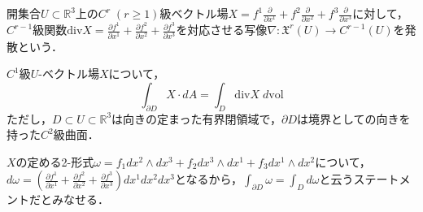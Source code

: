 \documentclass[uplatex, dvipdfmx]{jsreport}
\begin{document}
\begin{definition}[nabla]
    開集合$U\subset\mathbb{R}^3$上の$C^r\;(r\ge 1)$級ベクトル場$X=f^1\frac{\partial}{\partial x^1}+f^2\frac{\partial}{\partial x^2} +f^3\frac{\partial}{\partial x^3}$に対して，$C^{r-1}$級関数$\mathrm{div}X=\frac{\partial f^1}{\partial x^1}+\frac{\partial f^2}{\partial x^2}+\frac{\partial f^3}{\partial x^3}$を対応させる写像$\nabla:\mathfrak{X}^r(U)\to C^{r-1}(U)$を発散という．
\end{definition}
\begin{shadebox}\begin{theorem}[Gauss]$C^1$級$U$-ベクトル場$X$について，
    \[\int_{\partial D}X\cdot dA=\int_D\mathrm{div}X\; d\mathrm{vol}\]
    ただし，$D\subset U\subset\mathbb{R}^3$は向きの定まった有界閉領域で，$\partial D$は境界としての向きを持った$C^2$級曲面．

    $X$の定める2-形式$\omega=f_{1}dx^2\wedge dx^3+f_{2}dx^3\wedge dx^1+f_{3}dx^1\wedge dx^2$について，$d\omega=\left(\frac{\partial f^1}{\partial x^1}+\frac{\partial f^2}{\partial x^2} +\frac{\partial f^3}{\partial x^3}\right)dx^1dx^2dx^3$となるから，$\int_{\partial D}\omega=\int_Dd\omega$と云うステートメントだとみなせる．
\end{theorem}\end{shadebox}
\end{document}
